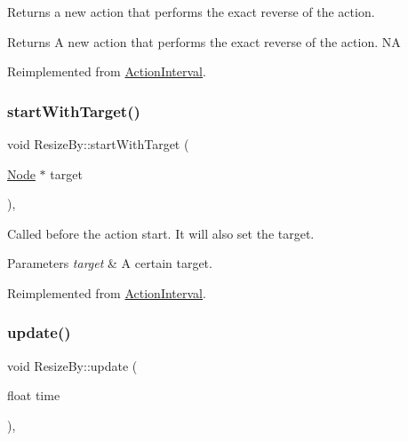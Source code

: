 Returns a new action that performs the exact reverse of the action.

\begin{DoxyReturn}{Returns}
A new action that performs the exact reverse of the action.  NA 
\end{DoxyReturn}


Reimplemented from \hyperlink{classActionInterval_a9f9ac7164036a0bc261a72f62a2b2da7}{Action\+Interval}.

\mbox{\label{classResizeBy_ad13f3b670bd86ef939ce97460baeb8bd}} 
\subsubsection{\texorpdfstring{start\+With\+Target()}{startWithTarget()}}
{\footnotesize\ttfamily void Resize\+By\+::start\+With\+Target (\begin{DoxyParamCaption}\item[{\hyperlink{classNode}{Node} $\ast$}]{target }\end{DoxyParamCaption})\hspace{0.3cm}{\ttfamily [override]}, {\ttfamily [virtual]}}

Called before the action start. It will also set the target.


\begin{DoxyParams}{Parameters}
{\em target} & A certain target. \\
\hline
\end{DoxyParams}


Reimplemented from \hyperlink{classActionInterval_ad3d91186b2c3108488ddbbdbbd982484}{Action\+Interval}.

\mbox{\label{classResizeBy_aa04b69df4e3c06baba3141932dbd0d2e}} 
\subsubsection{\texorpdfstring{update()}{update()}}
{\footnotesize\ttfamily void Resize\+By\+::update (\begin{DoxyParamCaption}\item[{float}]{time }\end{DoxyParamCaption})\hspace{0.3cm}{\ttfamily [override]}, {\ttfamily [virtual]}}



